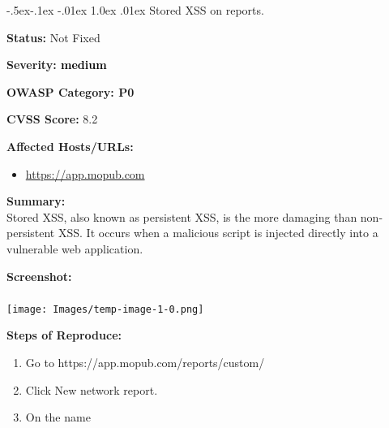 \documentclass{article}
\makeatletter
\renewcommand{\subsection}{\@startsection{subsection}{2}{\z@}%
            {-.5ex\@plus -.1ex \@minus -.01ex}%
            {1.0ex \@plus .01ex}%
            {\normalfont\large\color{subsectioncolor}}}
\makeatother
\begin{document}
                    \subsection{\large Stored XSS on reports.}
                    \begin{description}[itemsep=2pt, leftmargin=0.2cm]
                        \item \large \textbf{Status:} Not Fixed
                        \item \large \textbf{Severity: \textcolor{infotext} {medium}}
                        \item \large \textbf{OWASP Category: P0}
                        \item \large \textbf{CVSS Score:} 8.2 
                        \item \large \textbf{Affected Hosts/URLs:}
                            \begin{itemize} 
                            \item \large \href{https://app.mopub.com} {https://app.mopub.com}
                            \end{itemize}
                        \item \large \textbf{Summary:} \\  Stored XSS, also known as persistent XSS, is the more damaging than non-persistent XSS. It occurs when a malicious script is injected directly into a vulnerable web application.

                        \item \large \textbf{Screenshot:} \\ \\
                            \texttt{[image: Images/temp-image-1-0.png]} \\

                        \item \large \textbf{Steps of Reproduce:}
                        \linespread{1.0}
                        \begin{enumerate}[leftmargin=0.5cm]
                            
                        \item \large Go to https://app.mopub.com/reports/custom/

                        \item \large Click New network report.

                        \item \large On the name


\end{enumerate}
\end{description}
\end{document}
